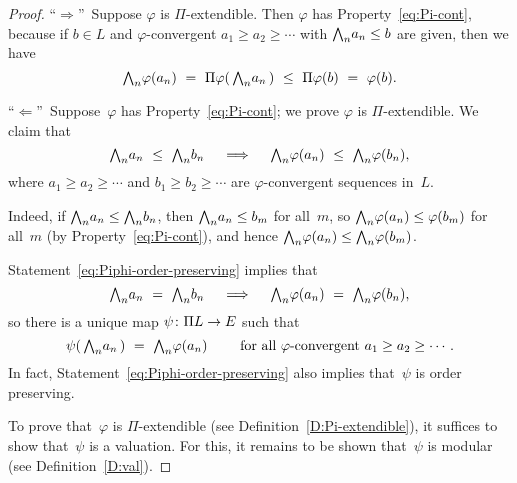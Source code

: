 \begin{proof}
``$\Longrightarrow$''\ 
Suppose $\varphi$ is $\Pi$-extendible.
Then $\varphi$ has Property~\eqref{eq:Pi-cont},
because if $b\in L$ and $\varphi$-convergent $a_1 \geq a_2 \geq \dotsb$
with $\textstyle{\bigwedge}_n a_n \leq b$ are given,
then we have
\begin{equation*}
\bw_n \varphi(a_n) 
\ =\ 
\Pi\varphi(\,\bw_n a_n\,)
\ \leq\ 
\Pi\varphi(b)
\ =\ 
\varphi(b).
\end{equation*}

\noindent``$\Longleftarrow$''\ 
Suppose~$\varphi$ has Property~\eqref{eq:Pi-cont};
we prove $\varphi$ is $\Pi$-extendible.
We claim that
\begin{equation}
\label{eq:Piphi-order-preserving}
\textstyle{\bigwedge}_n a_n \ \leq\ \textstyle{\bigwedge}_n b_n 
\quad\implies\quad
\textstyle{\bigwedge}_n \varphi(a_n) \ \leq\ \textstyle{\bigwedge}_n \varphi(b_n),
\end{equation}
where $a_1 \geq a_2 \geq \dotsb$ and $b_1 \geq b_2 \geq \dotsb$
are $\varphi$-convergent sequences in~$L$.

Indeed,
if $\textstyle{\bigwedge}_n a_n \leq \textstyle{\bigwedge}_n b_n$,
then $\textstyle{\bigwedge}_n a_n \leq b_m$ for all~$m$,
so $\textstyle{\bigwedge}_n \varphi(a_n) \leq \varphi(b_m)$ for all~$m$
(by Property~\eqref{eq:Pi-cont}),
and hence $\textstyle{\bigwedge}_n \varphi(a_n) \leq \textstyle{\bigwedge}_n \varphi(b_m)$.

Statement~\eqref{eq:Piphi-order-preserving} implies that
\begin{equation*}
\textstyle{\bigwedge}_n a_n \ =\  \textstyle{\bigwedge}_n b_n 
\quad\implies\quad 
\textstyle{\bigwedge}_n\varphi(a_n) \ =\  \textstyle{\bigwedge}_n \varphi(b_n),
\end{equation*}
so there is a unique map $\psi\colon \Pi L \rightarrow E$ such that
\begin{equation}
\label{eq:def-psi}
\psi(\,\textstyle{\bigwedge}_n a_n\,) \ =\ \textstyle{\bigwedge}_n \varphi(a_n)
\qquad
\text{ for all $\varphi$-convergent }a_1 \geq a_2 \geq \dotsb.
\end{equation}
In fact, 
Statement~\eqref{eq:Piphi-order-preserving}
also implies that~$\psi$ is order preserving.

To prove that~$\varphi$ is $\Pi$-extendible
(see Definition~\ref{D:Pi-extendible}),
it suffices to show that~$\psi$ is a valuation.
For this,
it remains to be shown that~$\psi$ is modular
(see Definition~\ref{D:val}).


\end{proof}
